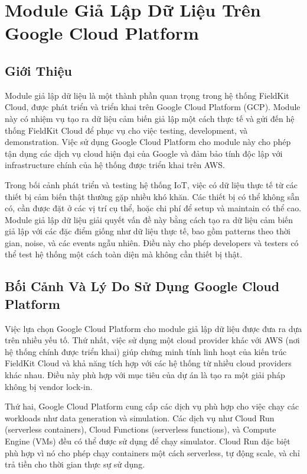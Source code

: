 \section{Module Giả Lập Dữ Liệu Trên Google Cloud Platform}

\subsection{Giới Thiệu}

Module giả lập dữ liệu là một thành phần quan trọng trong hệ thống FieldKit Cloud, được phát triển và triển khai trên Google Cloud Platform (GCP). Module này có nhiệm vụ tạo ra dữ liệu cảm biến giả lập một cách thực tế và gửi đến hệ thống FieldKit Cloud để phục vụ cho việc testing, development, và demonstration. Việc sử dụng Google Cloud Platform cho module này cho phép tận dụng các dịch vụ cloud hiện đại của Google và đảm bảo tính độc lập với infrastructure chính của hệ thống được triển khai trên AWS.

Trong bối cảnh phát triển và testing hệ thống IoT, việc có dữ liệu thực tế từ các thiết bị cảm biến thật thường gặp nhiều khó khăn. Các thiết bị có thể không sẵn có, cần được đặt ở các vị trí cụ thể, hoặc chi phí để setup và maintain có thể cao. Module giả lập dữ liệu giải quyết vấn đề này bằng cách tạo ra dữ liệu cảm biến giả lập với các đặc điểm giống như dữ liệu thực tế, bao gồm patterns theo thời gian, noise, và các events ngẫu nhiên. Điều này cho phép developers và testers có thể test hệ thống một cách toàn diện mà không cần thiết bị thật.

\subsection{Bối Cảnh Và Lý Do Sử Dụng Google Cloud Platform}

Việc lựa chọn Google Cloud Platform cho module giả lập dữ liệu được đưa ra dựa trên nhiều yếu tố. Thứ nhất, việc sử dụng một cloud provider khác với AWS (nơi hệ thống chính được triển khai) giúp chứng minh tính linh hoạt của kiến trúc FieldKit Cloud và khả năng tích hợp với các hệ thống từ nhiều cloud providers khác nhau. Điều này phù hợp với mục tiêu của dự án là tạo ra một giải pháp không bị vendor lock-in.

Thứ hai, Google Cloud Platform cung cấp các dịch vụ phù hợp cho việc chạy các workloads như data generation và simulation. Các dịch vụ như Cloud Run (serverless containers), Cloud Functions (serverless functions), và Compute Engine (VMs) đều có thể được sử dụng để chạy simulator. Cloud Run đặc biệt phù hợp vì nó cho phép chạy containers một cách serverless, tự động scale, và chỉ trả tiền cho thời gian thực sự sử dụng.

